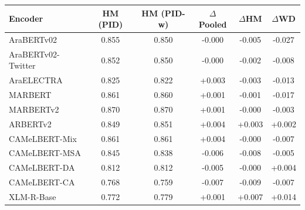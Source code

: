 \begin{tabular}{lcc|ccc}
\toprule
\textbf{Encoder} & HM (PID) & HM (PID-w) & $\Delta$Pooled & $\Delta$HM & $\Delta$WD \\
\midrule
AraBERTv02 & 0.855 & 0.850 & -0.000 & -0.005 & -0.027 \\
AraBERTv02-Twitter & 0.852 & 0.850 & -0.000 & -0.002 & -0.008 \\
AraELECTRA & 0.825 & 0.822 & +0.003 & -0.003 & -0.013 \\
MARBERT & 0.861 & 0.860 & +0.001 & -0.001 & -0.017 \\
MARBERTv2 & 0.870 & 0.870 & +0.001 & -0.000 & -0.003 \\
ARBERTv2 & 0.849 & 0.851 & +0.004 & +0.003 & +0.002 \\
CAMeLBERT-Mix & 0.861 & 0.861 & +0.004 & -0.000 & -0.007 \\
CAMeLBERT-MSA & 0.845 & 0.838 & -0.006 & -0.008 & -0.005 \\
CAMeLBERT-DA & 0.812 & 0.812 & -0.005 & -0.000 & +0.004 \\
CAMeLBERT-CA & 0.768 & 0.759 & -0.007 & -0.009 & -0.007 \\
XLM-R-Base & 0.772 & 0.779 & +0.001 & +0.007 & +0.014 \\
\bottomrule
\end{tabular}
